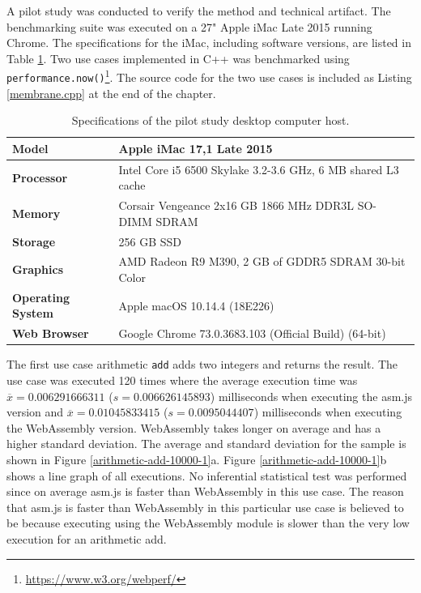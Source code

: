 A pilot study was conducted to verify the method and technical artifact. The benchmarking suite was executed on a 27" Apple iMac Late 2015 running Chrome. The specifications for the iMac, including software versions, are listed in Table \ref{specifications}. Two use cases implemented in C++ was benchmarked using \texttt{performance.now()}\footnote{\url{https://www.w3.org/webperf/}}. The source code for the two use cases is included as Listing \ref{membrane.cpp} at the end of the chapter.

\begin{table}[!h]
\caption{\label{specifications}Specifications of the pilot study desktop computer host.}
\centering
\begin{tabular}{ll}
\hline
\textbf{Model} & Apple iMac 17,1 Late 2015\\ \hline
\textbf{Processor} & Intel Core i5 6500 Skylake 3.2-3.6 GHz, 6 MB shared L3 cache \\
\textbf{Memory} & Corsair Vengeance 2x16 GB 1866 MHz DDR3L SO-DIMM SDRAM \\
\textbf{Storage} & 256 GB SSD \\
\textbf{Graphics} & AMD Radeon R9 M390, 2 GB of GDDR5 SDRAM 30-bit Color \\ \hline
\textbf{Operating System} & Apple macOS 10.14.4 (18E226) \\
\textbf{Web Browser} & Google Chrome 73.0.3683.103 (Official Build) (64-bit) \\ \hline
\end{tabular}
\end{table}

The first use case arithmetic \texttt{add} adds two integers and returns the result. The use case was executed 120 times where the average execution time was $\overline{x}=0.006291666311$ ($s=0.006626145893$) milliseconds when executing the asm.js version and $\overline{x}=0.01045833415$ ($s=0.0095044407$) milliseconds when executing the WebAssembly version. WebAssembly takes longer on average and has a higher standard deviation. The average and standard deviation for the sample is shown in Figure \ref{arithmetic-add-10000-1}a. Figure \ref{arithmetic-add-10000-1}b shows a line graph of all executions. No inferential statistical test was performed since on average asm.js is faster than WebAssembly in this use case. The reason that asm.js is faster than WebAssembly in this particular use case is believed to be because executing using the WebAssembly module is slower than the very low execution for an arithmetic add.

